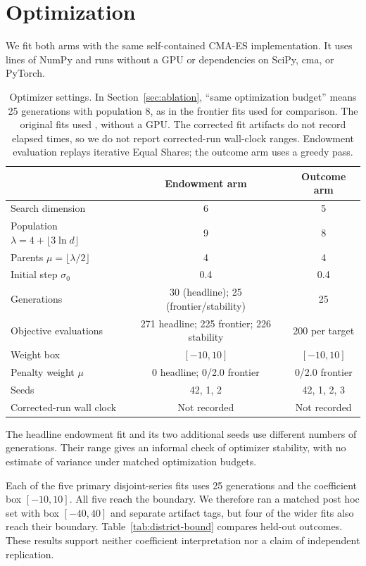\section{Optimization}
\label{app:optim}

We fit both arms with the same self-contained CMA-ES implementation. It uses
\OptimizerLines{} lines of NumPy and runs without a GPU or dependencies on
SciPy, cma, or PyTorch.

\begin{table}[ht]
\centering\small
\begin{tabular}{lcc}
\toprule
 & Endowment arm & Outcome arm \\
\midrule
Search dimension & 6 & 5 \\
Population $\lambda = 4 + \lfloor 3\ln d\rfloor$ & 9 & 8 \\
Parents $\mu = \lfloor \lambda/2 \rfloor$ & 4 & 4 \\
Initial step $\sigma_0$ & 0.4 & 0.4 \\
Generations & 30 (headline); 25 (frontier/stability) & 25 \\
Objective evaluations & 271 headline; 225 frontier; 226 stability & 200 per target \\
Weight box & $[-10, 10]$ & $[-10, 10]$ \\
Penalty weight $\mu$ & 0 headline; 0/2.0 frontier & 0/2.0 frontier \\
Seeds & 42, 1, 2 & 42, 1, 2, 3 \\
Corrected-run wall clock & Not recorded & Not recorded \\
\bottomrule
\end{tabular}
\caption{Optimizer settings. In Section~\ref{sec:ablation}, ``same optimization
budget'' means 25 generations with population 8, as in the frontier fits used
for comparison. The original fits used \computehardware, without a GPU.
The corrected fit artifacts do not record elapsed times, so we do not report
corrected-run wall-clock ranges. Endowment evaluation replays iterative Equal
Shares; the outcome arm uses a greedy pass.}
\end{table}

The headline endowment fit and its two additional seeds use different numbers
of generations. Their range gives an informal check of optimizer stability,
with no estimate of variance under matched optimization budgets.

Each of the five primary disjoint-series fits uses 25 generations and the
coefficient box $[-10,10]$. All five reach the boundary. We therefore ran a
matched post hoc set with box $[-40,40]$ and separate artifact tags, but four
of the wider fits also reach their boundary. Table~\ref{tab:district-bound}
compares held-out outcomes. These results support neither coefficient
interpretation nor a claim of independent replication.


